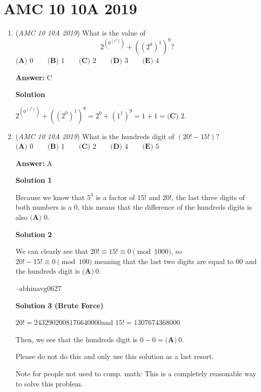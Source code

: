 \section{AMC 10 10A 2019}
        \begin{enumerate}
        	\item (\textit{AMC 10 10A 2019}) What is the value of 
 \[2^{\left(0^{\left(1^9\right)}\right)}+\left(\left(2^0\right)^1\right)^9?\]
$\textbf{(A) } 0 \qquad\textbf{(B) } 1 \qquad\textbf{(C) } 2 \qquad\textbf{(D) } 3 \qquad\textbf{(E) } 4$

 \textbf{Answer: }C



\textbf{Solution}

$2^{\left(0^{\left(1^9\right)}\right)}+\left(\left(2^0\right)^1\right)^9= 2^0 + (1^1)^9 = 1+1 = \boxed{\textbf{(C) } 2}$.

 


	\item (\textit{AMC 10 10A 2019}) What is the hundreds digit of $(20!-15!)?$
$\textbf{(A) }0\qquad\textbf{(B) }1\qquad\textbf{(C) }2\qquad\textbf{(D) }4\qquad\textbf{(E) }5$

 \textbf{Answer: }A



\textbf{Solution 1}

Because we know that $5^3$ is a factor of $15!$ and $20!$, the last three digits of both numbers is a $0$, this means that the difference of the hundreds digits is also $\boxed{\textbf{(A) }0}$.

 



\textbf{Solution 2}

We can clearly see that $20! \equiv 15! \equiv 0 \pmod{1000}$, so $20! - 15! \equiv 0 \pmod{100}$ meaning that the last two digits are equal to $00$ and the hundreds digit is $\boxed{\textbf{(A)}\ 0}$.

 --abhinavg0627

 



\textbf{Solution 3 (Brute Force)}

$20!= 2432902008176640000$and $15!= 1307674368000$

 Then, we see that the hundreds digit is $0-0=\boxed{\textbf{(A)}\ 0}$.

 Please do not do this and only use this solution as a last resort.

 Note for people not used to comp. math: This is a completely reasonable way to solve this problem.


\end{enumerate}
